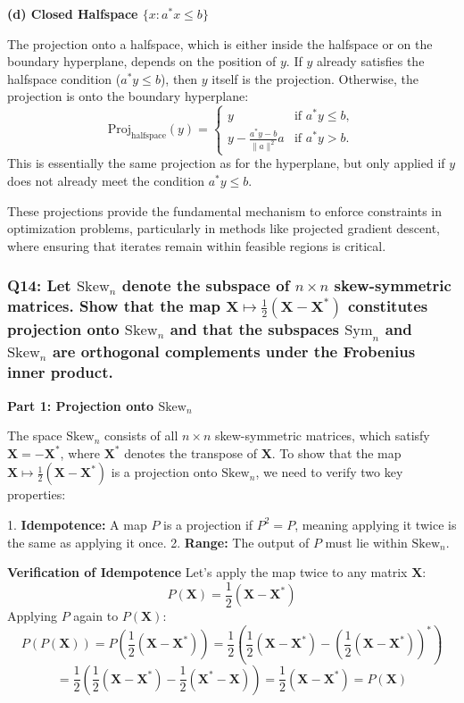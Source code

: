 \documentclass[8pt]{article}
\begin{document}
{\textbf{(d) Closed Halfspace \(\{x : a^* x \leq b\}\)}

The projection onto a halfspace, which is either inside the halfspace or on the boundary hyperplane, depends on the position of \(y\). If \(y\) already satisfies the halfspace condition (\(a^* y \leq b\)), then \(y\) itself is the projection. Otherwise, the projection is onto the boundary hyperplane:
\[ \text{Proj}_{\text{halfspace}}(y) = \begin{cases} 
y & \text{if } a^* y \leq b, \\
y - \frac{a^* y - b}{\|a\|^2} a & \text{if } a^* y > b.
\end{cases} \]
This is essentially the same projection as for the hyperplane, but only applied if \(y\) does not already meet the condition \(a^* y \leq b\).

These projections provide the fundamental mechanism to enforce constraints in optimization problems, particularly in methods like projected gradient descent, where ensuring that iterates remain within feasible regions is critical.

\subsubsection*{Q14: Let \(\mathrm{Skew}_n\) denote the subspace of \(n \times n\) skew-symmetric matrices. Show that the map \(\mathbf{X} \mapsto \frac{1}{2} (\mathbf{X} - \mathbf{X}^*)\) constitutes projection onto \(\mathrm{Skew}_n\) and that the subspaces \(\mathrm{Sym}_n\) and \(\mathrm{Skew}_n\) are orthogonal complements under the Frobenius inner product.}

\textbf{Part 1: Projection onto \(\mathrm{Skew}_n\)}

The space \(\mathrm{Skew}_n\) consists of all \(n \times n\) skew-symmetric matrices, which satisfy \(\mathbf{X} = -\mathbf{X}^*\), where \(\mathbf{X}^*\) denotes the transpose of \(\mathbf{X}\). To show that the map \(\mathbf{X} \mapsto \frac{1}{2} (\mathbf{X} - \mathbf{X}^*)\) is a projection onto \(\mathrm{Skew}_n\), we need to verify two key properties:

1. \textbf{Idempotence:} A map \(P\) is a projection if \(P^2 = P\), meaning applying it twice is the same as applying it once.
2. \textbf{Range: }The output of \(P\) must lie within \(\mathrm{Skew}_n\).

\textbf{Verification of Idempotence}
Let's apply the map twice to any matrix \(\mathbf{X}\):
\[
P(\mathbf{X}) = \frac{1}{2} (\mathbf{X} - \mathbf{X}^*)
\]
Applying \(P\) again to \(P(\mathbf{X})\):
\[
P(P(\mathbf{X})) = P\left(\frac{1}{2} (\mathbf{X} - \mathbf{X}^*)\right) = \frac{1}{2} \left(\frac{1}{2} (\mathbf{X} - \mathbf{X}^*) - \left(\frac{1}{2} (\mathbf{X} - \mathbf{X}^*)\right)^*\right)
\]
\[
= \frac{1}{2} \left(\frac{1}{2} (\mathbf{X} - \mathbf{X}^*) - \frac{1}{2} (\mathbf{X}^* - \mathbf{X})\right) = \frac{1}{2} (\mathbf{X} - \mathbf{X}^*) = P(\mathbf{X})
\]

}
\end{document}
